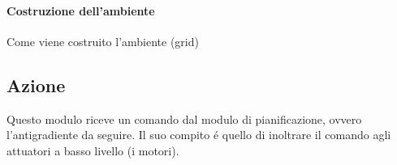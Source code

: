 \documentclass[14pt,a4paper]{extarticle}
\begin{document}



\paragraph{Costruzione dell'ambiente}
Come viene costruito l'ambiente (grid)\newpage

\subsection{Azione}
Questo modulo riceve un comando dal modulo di pianificazione, ovvero l'antigradiente da seguire. Il suo compito é quello di inoltrare il comando agli attuatori a basso livello (i motori).
\end{document}
